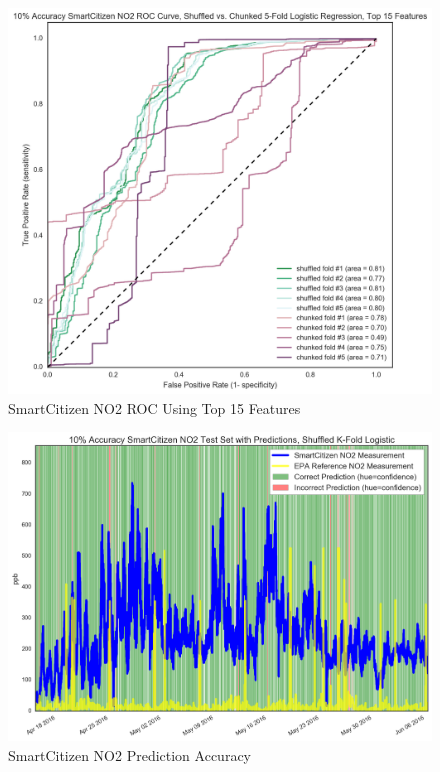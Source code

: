 \begin{figure}[htb]
 	\includegraphics[width=\textwidth]{figs/sck_no2_10_roc_pruned_features}               
 	 \caption{SmartCitizen NO2 ROC Using Top 15 Features}
  	\label{fig:sck_no2_10_roc_pruned_features}
\end{figure}

\begin{figure}[htb]
 	\includegraphics[width=\textwidth]{figs/sck_no2_10_logistic_predictions}               
 	 \caption{SmartCitizen NO2 Prediction Accuracy}
  	\label{fig:sck_no2_10_logistic_predictions}
\end{figure}



